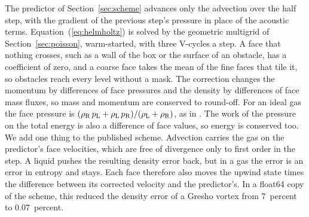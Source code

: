 \documentclass[twocolumn]{aastex701}
\begin{document}
The predictor of Section~\ref{sec:scheme} advances only the advection over the half step, with the gradient of the previous step's pressure in place of the acoustic terms. Equation~(\ref{eq:helmholtz}) is solved by the geometric multigrid of Section~\ref{sec:poisson}, warm-started, with three V-cycles a step. A face that nothing crosses, such as a wall of the box or the surface of an obstacle, has a coefficient of zero, and a coarse face takes the mean of the fine faces that tile it, so obstacles reach every level without a mask. The correction changes the momentum by differences of face pressures and the density by differences of face mass fluxes, so mass and momentum are conserved to round-off. For an ideal gas the face pressure is $(\rho_{\rm R}\,p_{\rm L} + \rho_{\rm L}\,p_{\rm R})/(\rho_{\rm L} + \rho_{\rm R})$, as in \citet{Kwatra2009}. The work of the pressure on the total energy is also a difference of face values, so energy is conserved too. We add one thing to the published scheme. Advection carries the gas on the predictor's face velocities, which are free of divergence only to first order in the step. A liquid pushes the resulting density error back, but in a gas the error is an error in entropy and stays. Each face therefore also moves the upwind state times the difference between its corrected velocity and the predictor's. In a float64 copy of the scheme, this reduced the density error of a Gresho vortex from 7~percent to 0.07~percent.
\end{document}

